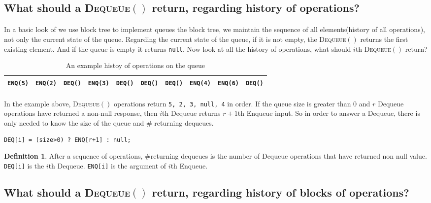 \documentclass[10pt]{article}
\theoremstyle{definition}
\newtheorem{definition}{Definition}
\begin{document}
\subsection{What should a \textsc{Dequeue}$()$ return, regarding history of operations?}
\paragraph{}
In a basic look of we use block tree to implement queues the block tree, we maintain the sequence of all elements(history of all operations), not only the current state of the queue. Regarding the current state of the queue, if it is not empty, the \textsc{Dequeue}$()$ returns the first existing element. And if the queue is empty it returns \texttt{null}. Now look at all the history of operations, what should $i$th \textsc{Dequeue}$()$ return?

\begin{table}[hbt]
\centering
  \begin{tabular}{c|c|c|c|c|c|c|c|c|c}
    \hline \texttt{ENQ(5)}& \texttt{ENQ(2)}& \texttt{DEQ()}& \texttt{ENQ(3)}&\texttt{DEQ()}& \texttt{DEQ()}& \texttt{DEQ()}& \texttt{ENQ(4)}& \texttt{ENQ(6)}& \texttt{DEQ()}\\ \hline
  \end{tabular}
  \caption{An example histoy of operations on the queue}
\end{table}

\paragraph{}
In the example above, \textsc{Dequeue}$()$ operations return \texttt{5, 2, 3, null, 4} in order. If the queue size is greater than $0$ and $r$ Dequeue operations have returned a non-null response, then $i$th Dequeue returns $r+1$th Enqueue input. So in order to answer a Dequeue, there is only needed to know the size of the queue and $\#$ returning dequeues.

\texttt{DEQ[i] = (size>0) ? ENQ[r+1] : null;}
\begin{definition}
After a sequence of operations, $\#$returning dequeues is the number of Dequeue operations that have returned non null value. \texttt{DEQ[i]} is the $i$th Dequeue. \texttt{ENQ[i]} is the argument of $i$th Enqueue.
\end{definition}

\subsection{What should a \textsc{Dequeue}$()$ return, regarding history of blocks of operations?}
\end{document}
